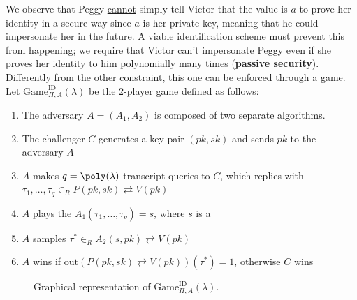 \documentclass[a4paper, 12pt]{report}
\begin{document}
    We observe that Peggy \underline{cannot} simply tell Victor that the value is $a$ to prove her identity in a secure way since $a$ is her private key, meaning that he could impersonate her in the future. A viable identification scheme must prevent this from happening; we require that Victor can't impersonate Peggy even if she proves her identity to him polynomially many times (\textbf{passive security}). Differently from the other constraint, this one can be enforced through a game. Let $\mathrm{Game}_{\Pi, A}^{\text{ID}}(\lambda)$ be the 2-player game defined as follows:
    \begin{enumerate}
        \item The adversary $A = (A_1, A_2)$ is composed of two separate algorithms.
        \item The challenger $C$ generates a key pair $(pk, sk)$ and sends $pk$ to the adversary $A$
        \item $A$ makes $q = \poly(\lambda)$ transcript queries to $C$, which replies with $\tau_1, \ldots, \tau_q \in_R P(pk, sk) \rightleftarrows V(pk)$
        \item $A$ plays the $A_1(\tau_1, \ldots, \tau_q) = s$, where $s$ is a 
        \item $A$ samples $\tau^* \in_R A_2(s, pk) \rightleftarrows V(pk)$
        \item $A$ wins if $\mathrm{out}(P(pk, sk) \rightleftarrows V(pk))(\tau^*) = 1$, otherwise $C$ wins
    \end{enumerate}

    \begin{figure}[H]
        \centering


        \caption{Graphical representation of $\mathrm{Game}_{\Pi, A}^{\text{ID}}(\lambda)$.}
    \end{figure}
\end{document}
